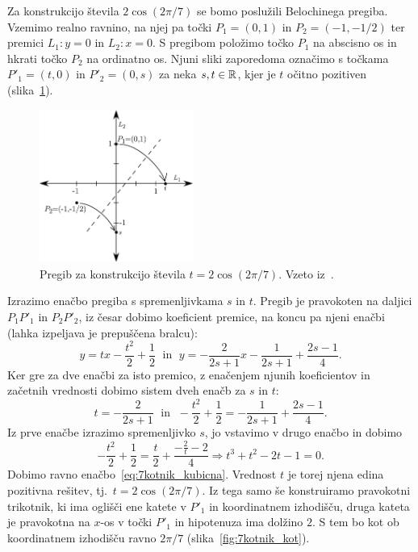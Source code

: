 Za konstrukcijo števila $2 \cos(2 \pi / 7)$ se bomo poslužili Belochinega pregiba. Vzemimo realno ravnino, na njej pa točki $P_1 = (0,1)$ in $P_2 = (-1, -1/2)$ ter premici $L_1 : y=0$ in $L_2: x=0$. S pregibom položimo točko $P_1$ na abscisno os in hkrati točko $P_2$ na ordinatno os. Njuni sliki zaporedoma označimo s točkama $P'_1 = (t,0)$ in $P'_2 = (0,s)$ za neka $s, t \in \mathbb R$, kjer je $t$ očitno pozitiven (slika~\ref{fig:7kotnik_pregib}).

\begin{figure}[h]
    \centering
    \includegraphics[width=0.45\textwidth]{images/n-kotniki/7kotnik_pregib.png}
    \caption[Pregib za konstrukcijo sedemkotnika]{Pregib za konstrukcijo števila $t = 2 \cos(2 \pi / 7)$. Vzeto iz~\cite[str.\ 184]{hull2009}.}
    \label{fig:7kotnik_pregib}
\end{figure}

Izrazimo enačbo pregiba s spremenljivkama $s$ in $t$. Pregib je pravokoten na daljici $P_1 P'_1$ in $P_2 P'_2$, iz česar dobimo koeficient premice, na koncu pa njeni enačbi (lahka izpeljava je prepuščena bralcu):
\begin{equation*}
    y = tx - \frac{t^2}{2} + \frac{1}{2} \; \text{ in } \; y = -\frac{2}{2s+1}x - \frac{1}{2s+1} + \frac{2s-1}{4}.
\end{equation*}
Ker gre za dve enačbi za isto premico, z enačenjem njunih koeficientov in začetnih vrednosti dobimo sistem dveh enačb za $s$ in $t$:
\begin{equation*}
    t = - \frac{2}{2s+1} \; \text{ in } \; - \frac{t^2}{2} + \frac{1}{2} = - \frac{1}{2s+1} + \frac{2s-1}{4}.
\end{equation*}
Iz prve enačbe izrazimo spremenljivko $s$, jo vstavimo v drugo enačbo in dobimo
\begin{equation*}
    - \frac{t^2}{2} + \frac{1}{2} = \frac{t}{2} + \frac{-\frac{2}{t}-2}{4} \Rightarrow t^3 + t^2 - 2t - 1 = 0.
\end{equation*}
Dobimo ravno enačbo~\eqref{eq:7kotnik_kubicna}. Vrednost $t$ je torej njena edina pozitivna rešitev, tj.\ $t = 2 \cos(2 \pi / 7)$. Iz tega samo še konstruiramo pravokotni trikotnik, ki ima oglišči ene katete v $P'_1$ in koordinatnem izhodišču, druga kateta je pravokotna na $x$-os v točki $P'_1$ in hipotenuza ima dolžino $2$. S tem bo kot ob koordinatnem izhodišču ravno $2 \pi /7$ (slika~\ref{fig:7kotnik_kot}).

